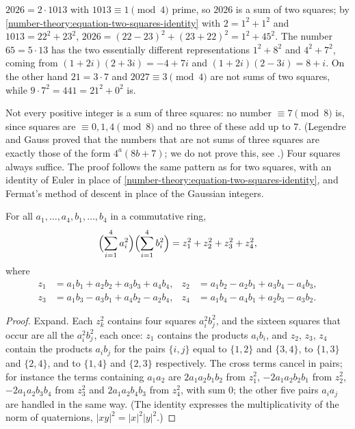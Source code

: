 \begin{example}\label{number-theory:example-two-squares}
$2026 = 2 \cdot 1013$ with $1013 \equiv 1 \pmod 4$ prime, so $2026$ is a sum of two squares; by \eqref{number-theory:equation-two-squares-identity} with $2 = 1^2 + 1^2$ and $1013 = 22^2 + 23^2$,
$2026 = (22 - 23)^2 + (23 + 22)^2 = 1^2 + 45^2$. The number $65 = 5 \cdot 13$ has the two essentially different representations $1^2 + 8^2$ and $4^2 + 7^2$, coming from $(1 + 2i)(2 + 3i) = -4 + 7i$ and
$(1 + 2i)(2 - 3i) = 8 + i$. On the other hand $21 = 3 \cdot 7$ and $2027 \equiv 3 \pmod 4$ are not sums of two squares, while $9 \cdot 7^2 = 441 = 21^2 + 0^2$ is.
\end{example}

Not every positive integer is a sum of three squares: no number $\equiv 7 \pmod 8$ is, since squares are $\equiv 0, 1, 4 \pmod 8$ and no three of these add up to $7$. (Legendre and Gauss proved that the
numbers that are not sums of three squares are exactly those of the form $4^a(8b + 7)$; we do not prove this, see \cite{serre-arithmetic}.) Four squares always suffice. The proof follows the same pattern as for two squares,
with an identity of Euler in place of \eqref{number-theory:equation-two-squares-identity}, and Fermat's method of descent in place of the Gaussian integers.

\begin{lemma}\label{number-theory:lemma-four-squares-identity}
For all $a_1, \ldots, a_4, b_1, \ldots, b_4$ in a commutative ring,
\[
\Bigl(\sum_{i=1}^{4}a_i^2\Bigr)\Bigl(\sum_{i=1}^{4}b_i^2\Bigr) = z_1^2 + z_2^2 + z_3^2 + z_4^2,
\]
where
\[
\begin{aligned}
z_1 &= a_1b_1 + a_2b_2 + a_3b_3 + a_4b_4, & z_2 &= a_1b_2 - a_2b_1 + a_3b_4 - a_4b_3, \\
z_3 &= a_1b_3 - a_3b_1 + a_4b_2 - a_2b_4, & z_4 &= a_1b_4 - a_4b_1 + a_2b_3 - a_3b_2 .
\end{aligned}
\]
\end{lemma}

\begin{proof}
Expand. Each $z_k^2$ contains four squares $a_i^2b_j^2$, and the sixteen squares that occur are all the $a_i^2b_j^2$, each once: $z_1$ contains the products $a_ib_i$, and $z_2$, $z_3$, $z_4$ contain the
products $a_ib_j$ for the pairs $\{i, j\}$ equal to $\{1, 2\}$ and $\{3, 4\}$, to $\{1, 3\}$ and $\{2, 4\}$, and to $\{1, 4\}$ and $\{2, 3\}$ respectively. The cross terms cancel in pairs; for instance the
terms containing $a_1a_2$ are $2a_1a_2b_1b_2$ from $z_1^2$, $-2a_1a_2b_2b_1$ from $z_2^2$, $-2a_1a_2b_3b_4$ from $z_3^2$ and $2a_1a_2b_4b_3$ from $z_4^2$, with sum $0$; the other five pairs $a_ia_j$ are
handled in the same way. (The identity expresses the multiplicativity of the norm of quaternions, $|xy|^2 = |x|^2|y|^2$.)
\end{proof}


